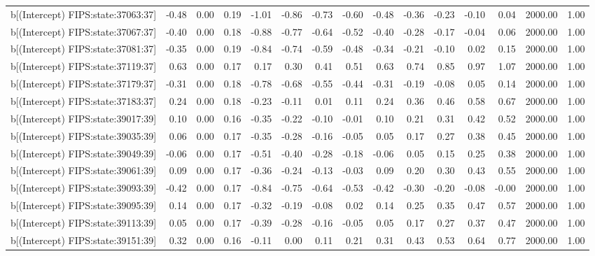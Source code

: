 \begin{table}[ht]
\begin{tabular}{rrrrrrrrrrrrrrr}
  b[(Intercept) FIPS:state:37063:37] & -0.48 & 0.00 & 0.19 & -1.01 & -0.86 & -0.73 & -0.60 & -0.48 & -0.36 & -0.23 & -0.10 & 0.04 & 2000.00 & 1.00 \\ 
  b[(Intercept) FIPS:state:37067:37] & -0.40 & 0.00 & 0.18 & -0.88 & -0.77 & -0.64 & -0.52 & -0.40 & -0.28 & -0.17 & -0.04 & 0.06 & 2000.00 & 1.00 \\ 
  b[(Intercept) FIPS:state:37081:37] & -0.35 & 0.00 & 0.19 & -0.84 & -0.74 & -0.59 & -0.48 & -0.34 & -0.21 & -0.10 & 0.02 & 0.15 & 2000.00 & 1.00 \\ 
  b[(Intercept) FIPS:state:37119:37] & 0.63 & 0.00 & 0.17 & 0.17 & 0.30 & 0.41 & 0.51 & 0.63 & 0.74 & 0.85 & 0.97 & 1.07 & 2000.00 & 1.00 \\ 
  b[(Intercept) FIPS:state:37179:37] & -0.31 & 0.00 & 0.18 & -0.78 & -0.68 & -0.55 & -0.44 & -0.31 & -0.19 & -0.08 & 0.05 & 0.14 & 2000.00 & 1.00 \\ 
  b[(Intercept) FIPS:state:37183:37] & 0.24 & 0.00 & 0.18 & -0.23 & -0.11 & 0.01 & 0.11 & 0.24 & 0.36 & 0.46 & 0.58 & 0.67 & 2000.00 & 1.00 \\ 
  b[(Intercept) FIPS:state:39017:39] & 0.10 & 0.00 & 0.16 & -0.35 & -0.22 & -0.10 & -0.01 & 0.10 & 0.21 & 0.31 & 0.42 & 0.52 & 2000.00 & 1.00 \\ 
  b[(Intercept) FIPS:state:39035:39] & 0.06 & 0.00 & 0.17 & -0.35 & -0.28 & -0.16 & -0.05 & 0.05 & 0.17 & 0.27 & 0.38 & 0.45 & 2000.00 & 1.00 \\ 
  b[(Intercept) FIPS:state:39049:39] & -0.06 & 0.00 & 0.17 & -0.51 & -0.40 & -0.28 & -0.18 & -0.06 & 0.05 & 0.15 & 0.25 & 0.38 & 2000.00 & 1.00 \\ 
  b[(Intercept) FIPS:state:39061:39] & 0.09 & 0.00 & 0.17 & -0.36 & -0.24 & -0.13 & -0.03 & 0.09 & 0.20 & 0.30 & 0.43 & 0.55 & 2000.00 & 1.00 \\ 
  b[(Intercept) FIPS:state:39093:39] & -0.42 & 0.00 & 0.17 & -0.84 & -0.75 & -0.64 & -0.53 & -0.42 & -0.30 & -0.20 & -0.08 & -0.00 & 2000.00 & 1.00 \\ 
  b[(Intercept) FIPS:state:39095:39] & 0.14 & 0.00 & 0.17 & -0.32 & -0.19 & -0.08 & 0.02 & 0.14 & 0.25 & 0.35 & 0.47 & 0.57 & 2000.00 & 1.00 \\ 
  b[(Intercept) FIPS:state:39113:39] & 0.05 & 0.00 & 0.17 & -0.39 & -0.28 & -0.16 & -0.05 & 0.05 & 0.17 & 0.27 & 0.37 & 0.47 & 2000.00 & 1.00 \\ 
  b[(Intercept) FIPS:state:39151:39] & 0.32 & 0.00 & 0.16 & -0.11 & 0.00 & 0.11 & 0.21 & 0.31 & 0.43 & 0.53 & 0.64 & 0.77 & 2000.00 & 1.00 \\ 

\end{tabular}
\end{table}
